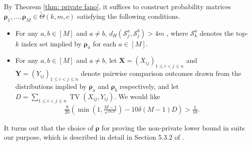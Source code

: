 \documentclass[letterpaper,12pt]{article}
\numberwithin{equation}{section}
\theoremstyle{plain}
\numberwithin{Theorem}{section}
\numberwithin{corollary}{section}
\numberwithin{proposition}{section}
\numberwithin{Lemma}{section}
{
	\theoremstyle{definition}
	\newtheorem{Definition}{Definition}
	\newtheorem{example}{Example}
	\numberwithin{example}{section}
	\newtheorem{fact}{Fact}
	\numberwithin{fact}{section}
	\newtheorem{remark}{Remark}
}
\newcommand{\1}{\mathbbm{1}}
\begin{document}
By Theorem \ref{thm: private fano}, it suffices to construct probability matrices $\bm \rho_1, \ldots, \bm \rho_M \in \widetilde \Theta(k, m, c)$ satisfying the following conditions.
\begin{itemize}
	\item For any $a, b \in [M]$ and $a \neq b$, $d_H(\mathcal S^a_j, \mathcal S^b_j) > 4m$ , where $\mathcal S^a_k$ denotes the top-$k$ index set implied by $\bm \rho_a$ for each $a \in [M]$.
	\item For any $a, b \in [M]$ and $a \neq b$, let $\bm X = \left(X_{ij}\right)_{1 \leq i < j \leq n}$ and $\bm Y = \left(Y_{ij}\right)_{1 \leq i < j \leq n}$ denote pairwise comparison outcomes drawn from the distributions implied by $\bm \rho_a$ and $\bm \rho_b$ respectively, and let $D = \sum_{1 \leq i < j \leq n} \operatorname{TV}(X_{ij}, Y_{ij})$. We would like
	\begin{align}\label{eq: condition for expected hamming distance}
		\frac{9}{20}\left(\min\left(1, \frac{M-1}{e^{10\varepsilon D}}\right) - 10\delta(M-1)D\right) > \frac{1}{10}.
	\end{align} 
\end{itemize}
It turns out that the choice of $\bm \rho$ for proving the non-private lower bound in \cite{shah2017simple} suits our purpose, which is described in detail in Section 5.3.2 of \cite{shah2017simple}. 
\end{document}
